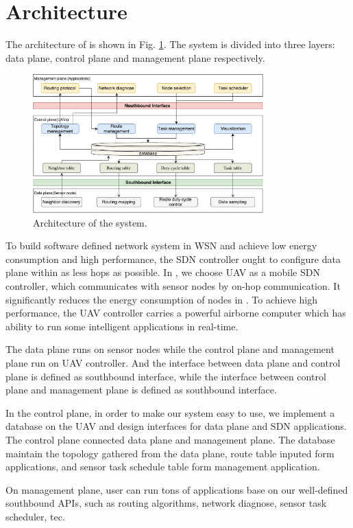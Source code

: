 \section{Architecture}
\label{Arc}


The architecture of {\sdn} is shown in Fig. \ref{Architecture}. 
The system is divided into three layers: data plane, 
control plane and management plane respectively.

\begin{figure}[htbp]
	\centering
	\includegraphics[width=3.5in]{./Figure/Architecture}
	\caption{Architecture of the system.}
	\label{Architecture}
\end{figure}

To build software defined network system in WSN and achieve low 
energy consumption and high performance, the SDN controller ought to  
configure data plane within as less hops as possible.  
In {\sdn}, we choose UAV as a mobile SDN controller,  
which communicates with sensor nodes by on-hop communication.
It significantly reduces the energy consumption of nodes in {\sdn}. 
To achieve high performance, the UAV controller carries
a powerful airborne computer which has ability to run 
some intelligent applications in real-time.

The data plane runs on sensor nodes while the control 
plane and management plane run on UAV controller. 
And the interface between data plane and control plane is defined as southbound interface,
while the interface between control plane and management plane is defined as southbound interface.

In the control plane, in order to make our system easy to use,  we implement a database on the UAV and design interfaces for data plane and SDN applications. The control plane connected data plane and 
management plane. The database maintain the topology gathered from the data plane, route table inputed form applications, and sensor task schedule table form management application.

On management plane, user can run tons of applications base on our well-defined southbound APIs, such as routing algorithms, network diagnose, sensor task 
scheduler, tec.

